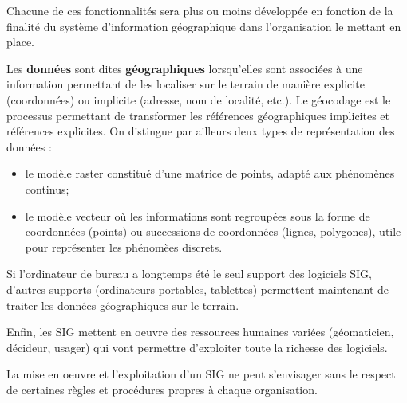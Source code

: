 \documentclass[11pt]{article}
\begin{document}
Chacune de ces fonctionnalités sera plus ou moins développée en fonction de la finalité du système d'information géographique dans l'organisation le mettant en place.

Les \textbf{données} sont dites \textbf{géographiques} lorsqu'elles sont associées à une information permettant de les localiser sur le terrain de manière explicite (coordonnées) ou implicite (adresse, nom de localité, etc.). Le géocodage est le processus permettant de transformer les références géographiques implicites et références explicites. On distingue par ailleurs deux types de représentation des données :
\begin{itemize}
	\item le modèle raster constitué d'une matrice de points, adapté aux phénomènes continus;
	\item le modèle vecteur où les informations sont regroupées sous la forme de coordonnées (points) ou successions de coordonnées (lignes, polygones), utile pour représenter les phénomèes discrets.
\end{itemize}

Si l'ordinateur de bureau a longtemps été le seul support des logiciels SIG, d'autres supports (ordinateurs portables, tablettes) permettent maintenant de traiter les données géographiques sur le terrain.

Enfin, les SIG mettent en oeuvre des ressources humaines variées (géomaticien, décideur, usager) qui vont permettre d'exploiter toute la richesse des logiciels.

La mise en oeuvre et l'exploitation d'un SIG ne peut s'envisager sans le respect de certaines règles et procédures propres à chaque organisation. 
\end{document}

